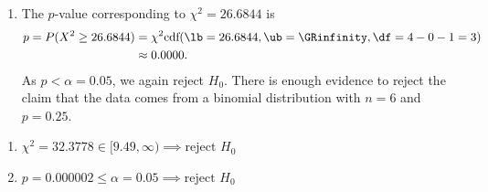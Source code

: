 {\begin{enumerate}
        The $\chi^2$ test statistic can then be computed as follows:
        \begin{align*}
            \chi^2 &= \sum_{i=1}^4 \left( \frac{(O_i - E_i)^2}{E_i}\right)^2 \\
                    &= \frac{ (4 - 8.8989)^2 }{ 8.8989 } + \ldots + \frac{ (22 - 8.4717)^2 }{ 8.4717 } \\
                    &\approx 26.6844
        \end{align*}
        Under assumption of $H_0$, the test statistic comes from a chi-square distribution with $\df = 4 - 0 - 1 = 3$ degrees of freedom.
        The critical region ($\alpha = 0.05$, $\chi^2$-test) is $Z = [C_R, \infty)$, and we can determine the value of $C_R$
        using the \enquote{numeric solver}:
        \begin{align*}
            y_1 &= \chi^2\text{cdf}(\lb=X, \ub=\GRinfinity, \df=4-0-1 = 3), \\
            y_2 &= \alpha = 0.05.
        \end{align*}
        The numeric solver returns a value $C_R \approx 7.8147$.
        As $\chi^2 = 26.6844$ lies in the critical region, we reject $H_0$.

        \item The $p$-value corresponding to $\chi^2 = 26.6844$ is 
        \begin{align*}
            p = P(X^2 \geq 26.6844)  &= \chi^2\text{cdf}(\lb=26.6844, \ub=\GRinfinity, \df=4-0-1 = 3) \\
                                     &\approx 0.0000.
        \end{align*}
        As $p < \alpha = 0.05$, we again reject $H_0$.
        There is enough evidence to reject the claim that the data comes from a binomial distribution with $n=6$ and $p=0.25$.
    \end{enumerate}

    \begin{enumerate}[label=(\alph*)]
        \item $\chi^2 = 32.3778 \in [9.49, \infty) \implies \text{reject } H_0$
        \item $p = 0.000002 \le \alpha = 0.05 \implies \text{reject } H_0$
    \end{enumerate}
}

